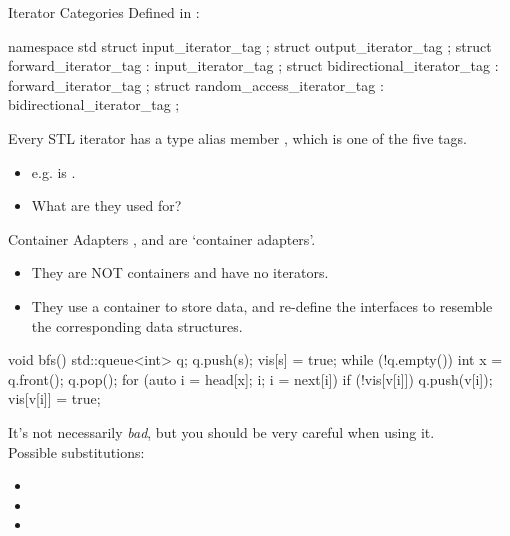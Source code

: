 \begin{frame}[fragile]{Iterator Categories}
    Defined in :
    \begin{cpp}
namespace std {
  struct input_iterator_tag {};
  struct output_iterator_tag {};
  struct forward_iterator_tag : input_iterator_tag {};
  struct bidirectional_iterator_tag : forward_iterator_tag {};
  struct random_access_iterator_tag
      : bidirectional_iterator_tag {};
}
    \end{cpp}
    \pause
    Every STL iterator has a type alias member , which is one of the five tags.
    \begin{itemize}
        \item e.g.  is .
        \item What are they used for?
    \end{itemize}
\end{frame}

\begin{frame}[fragile]{Container Adapters}
    ,  and  are `container adapters'.
    \begin{itemize}
        \item They are NOT containers and have no iterators.
        \item They use a container to store data, and re-define the interfaces to resemble the corresponding data structures.
    \end{itemize}
    \begin{cpp}
    void bfs() {
      std::queue<int> q;
      q.push(s); vis[s] = true;
      while (!q.empty()) {
        int x = q.front(); q.pop();
        for (auto i = head[x]; i; i = next[i])
          if (!vis[v[i]]) {
            q.push(v[i]);
            vis[v[i]] = true;
          }
      }
    }
    \end{cpp}
\end{frame}

\begin{frame}{}
    It's not necessarily \textit{bad}, but you should be very careful when using it.\\
    Possible substitutions:
    \begin{itemize}
        \item {}
        \item {}
        \item {}
    \end{itemize}
\end{frame}
